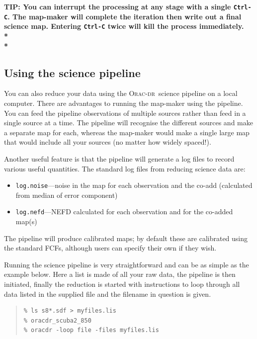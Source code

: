 \documentclass[twoside,11pt]{article}
\newcommand{\htmladdnormallink}[2]{#1}
\newcommand{\xlabel}[1]{}
\renewcommand{\_}{\texttt{\symbol{95}}}
\newenvironment{myquote}{\begin{quote}\begin{small}}{\end{small}\end{quote}}
\newcommand{\oracdr}{\htmladdnormallink{\textsc{Orac-dr}}{http://www.oracdr.org/oracdr}}
\begin{document}
\begin{htmlonly}
\textbf{TIP: You can interrupt the processing at any stage with a
single \texttt{Ctrl-C}. The map-maker will complete the iteration then write
out a final science map. Entering \texttt{Ctrl-C} twice  will
kill the process immediately.\\*\\*}
\end{htmlonly}

\subsection{\xlabel{sciencepl}Using the science pipeline}

You can also reduce your data using the \oracdr\ science pipeline on a
local computer. There are advantages to running the map-maker using
the pipeline. You can feed the pipeline observations of multiple
sources rather than feed in a single source at a time. The pipeline
will recognise the different sources and make a separate map for each,
whereas the map-maker would make a single large map that would include
all your sources (no matter how widely spaced!).

Another useful feature is that the pipeline will generate a log files to record
various useful quantities. The standard log files from reducing
science data are:

\begin{itemize}
\item \texttt{log.noise}---noise in the map for each observation and the co-add
(calculated from median of error component)
\item \texttt{log.nefd}---NEFD calculated for each observation and for the co-added map(s)
\end{itemize}
The pipeline will produce calibrated maps; by default these are
calibrated using the standard FCFs, although users can specify their
own if they wish.

Running the science pipeline is very straightforward and can be as
simple as the example below. Here a list is made of all your raw data,
the pipeline is then initiated, finally the reduction is started with
instructions to loop through all data listed in the supplied file and
the filename in question is given.

\begin{myquote}
\begin{verbatim}
% ls s8*.sdf > myfiles.lis
% oracdr_scuba2_850
% oracdr -loop file -files myfiles.lis
\end{verbatim}
\end{myquote}
\end{document}
